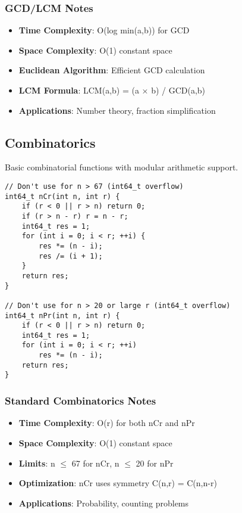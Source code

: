 \documentclass[11pt,a4paper]{article}
\begin{document}
\subsubsection*{GCD/LCM Notes}
\begin{itemize}
\item \textbf{Time Complexity}: O(log min(a,b)) for GCD
\item \textbf{Space Complexity}: O(1) constant space
\item \textbf{Euclidean Algorithm}: Efficient GCD calculation
\item \textbf{LCM Formula}: LCM(a,b) = (a × b) / GCD(a,b)
\item \textbf{Applications}: Number theory, fraction simplification
\end{itemize}

\newpage
\subsection{Combinatorics}
Basic combinatorial functions with modular arithmetic support.

\begin{lstlisting}[caption={Standard nCr and nPr}]
// Don't use for n > 67 (int64_t overflow)
int64_t nCr(int n, int r) {
    if (r < 0 || r > n) return 0;
    if (r > n - r) r = n - r;
    int64_t res = 1;
    for (int i = 0; i < r; ++i) {
        res *= (n - i);
        res /= (i + 1);
    }
    return res;
}

// Don't use for n > 20 or large r (int64_t overflow)
int64_t nPr(int n, int r) {
    if (r < 0 || r > n) return 0;
    int64_t res = 1;
    for (int i = 0; i < r; ++i)
        res *= (n - i);
    return res;
}
\end{lstlisting}

\subsubsection*{Standard Combinatorics Notes}
\begin{itemize}
\item \textbf{Time Complexity}: O(r) for both nCr and nPr
\item \textbf{Space Complexity}: O(1) constant space
\item \textbf{Limits}: n $\leq$ 67 for nCr, n $\leq$ 20 for nPr
\item \textbf{Optimization}: nCr uses symmetry C(n,r) = C(n,n-r)
\item \textbf{Applications}: Probability, counting problems
\end{itemize}
\end{document}
